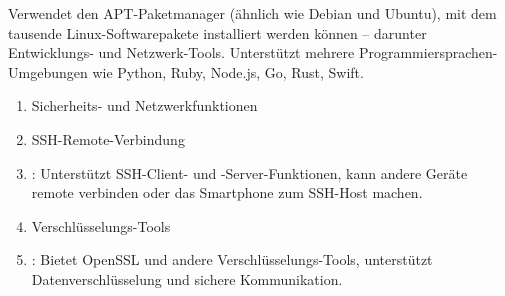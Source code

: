 \begin{tcbpractice}{Verwendet den APT-Paketmanager (ähnlich wie Debian und Ubuntu), mit dem tausende Linux-Softwarepakete installiert werden können – darunter Entwicklungs- und Netzwerk-Tools. Unterstützt mehrere Programmiersprachen-Umgebungen wie Python, Ruby, Node.js, Go, Rust, Swift.}
\begin{enumerate}
  \item Sicherheits- und Netzwerkfunktionen
  \item SSH-Remote-Verbindung
  \item : Unterstützt SSH-Client- und -Server-Funktionen, kann andere Geräte remote verbinden oder das Smartphone zum SSH-Host machen.
  \item Verschlüsselungs-Tools
  \item : Bietet OpenSSL und andere Verschlüsselungs-Tools, unterstützt Datenverschlüsselung und sichere Kommunikation.
\end{enumerate}

\end{tcbpractice}
